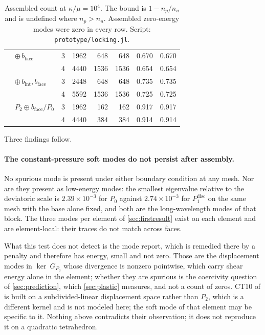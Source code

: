 \documentclass{article}
\newcommand{\code}[1]{\texttt{#1}}
\theoremstyle{definition}
\theoremstyle{plain}
\begin{document}
\begin{table}[h]
\begin{tabular}{@{}llrrrrrr@{}}
      & $\oplus\, b_{\mathrm{face}}$
                                  & 3 & 1962 & 648  & 648  & 0.670 & 0.670 \\
      &                           & 4 & 4440 & 1536 & 1536 & 0.654 & 0.654 \\
      & $\oplus\, b_{\mathrm{int}}, b_{\mathrm{face}}$
                                  & 3 & 2448 & 648  & 648  & 0.735 & 0.735 \\
      &                           & 4 & 5592 & 1536 & 1536 & 0.725 & 0.725 \\
      & $P_2 \oplus b_{\mathrm{face}}/P_0$
                                  & 3 & 1962 & 162  & 162  & 0.917 & 0.917 \\
      &                           & 4 & 4440 & 384  & 384  & 0.914 & 0.914 \\
\bottomrule
\end{tabular}
\caption{Assembled count at $\kappa/\mu = 10^4$. The bound is $1 - n_p/n_u$
and is undefined where $n_p > n_u$. Assembled zero-energy modes were zero in
every row. Script: \code{prototype/locking.jl}.}
\label{tab:assembled}
\end{table}

Three findings follow.

\paragraph{The constant-pressure soft modes do not persist after assembly.}
No spurious mode is present under either boundary condition at any mesh. Nor
are they present as low-energy modes: the smallest eigenvalue relative to the
deviatoric scale is $2.39\times10^{-3}$ for $P_0$ against $2.74\times10^{-3}$
for $P_1^{\mathrm{disc}}$ on the same mesh with the base alone fixed, and both
are the long-wavelength modes of that block. The three
modes per element of \cref{sec:firstresult} exist on each element and are element-local:
their traces do not match across faces.

What this test does not detect is the mode
\textcite{Foulk.etal:2021} report, which is remedied there by a penalty and therefore has energy, small and
not zero. Those are the displacement modes in $\ker ~G_{P_0}$ whose
divergence is nonzero pointwise, which carry
shear energy alone in the element; whether they are spurious is the coercivity question of
\cref{sec:prediction}, which \cref{sec:plastic} measures, and not a count of
zeros. CT10 of \textcite{Foulk.etal:2021} is
built on a subdivided-linear displacement space rather than $P_2$, which is a
different kernel and is not modeled here; the soft mode of that element may be
specific to it. Nothing above contradicts their observation; it does not
reproduce it on a quadratic tetrahedron.
\end{document}
